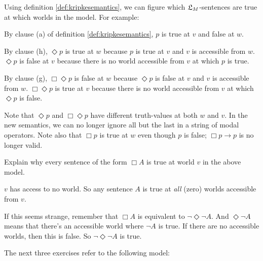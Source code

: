 \begin{center}
\end{center}
%
Using definition \ref{def:kripkesemantics}, we can figure which $\mathfrak{L}_M$-sentences
are true at which worlds in the model. For example:

\begin{itemize*}
  \item By clause (a) of definition \ref{def:kripkesemantics}, $p$ is true at
  $v$ and false at $w$.
  \item By clause (h), $\Diamond p$ is true at $w$ because $p$ is true at $v$
  and $v$ is accessible from $w$. $\Diamond p$ is false at $v$ because there is
  no world accessible from $v$ at which $p$ is true.
  \item By clause (g), $\Box\Diamond p$ is false at $w$ because $\Diamond p$ is
  false at $v$ and $v$ is accessible from $w$. $\Box\Diamond p$ is true at $v$
  because there is no world accessible from $v$ at which $\Diamond p$ is false.
\end{itemize*}
%
Note that $\Diamond p$ and $\Box \Diamond p$ have different truth-values at both
$w$ and $v$. In the new semantics, we can no longer ignore all but the last
in a string of modal operators. Note also that $\Box p$ is true at $w$ even
though $p$ is false; $\Box p \to p$ is no longer valid.

\begin{exercise}
  Explain why every sentence of the form $\Box A$ is true at world $v$
  in the above model.
\end{exercise}
\begin{solution}
  $v$ has access to no world. So any sentence $A$ is true at
  \emph{all} (zero) worlds accessible from $v$.

  If this seems strange, remember that $\Box A$ is equivalent to
  $\neg \Diamond \neg A$. And $\Diamond \neg A$ means that there's an
  accessible world where $\neg A$ is true. If there are no accessible
  worlds, then this is false. So $\neg \Diamond \neg A$ is true.
\end{solution}

The next three exercises refer to the following model:
%
\begin{center}
\end{center}

